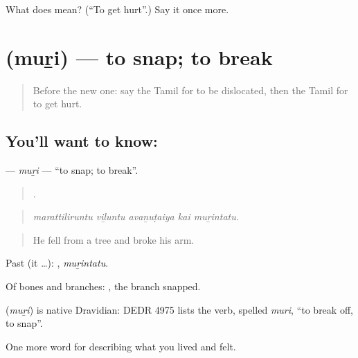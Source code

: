 \begin{tcolorbox}[breakable,colback=teal!4,colframe=teal!35!black,title={Before you move on}]
What does  mean? (\textquotedblleft{}To get hurt\textquotedblright{}.) Say it once more.
\end{tcolorbox}
\section[\texorpdfstring{\ta{முறி} (muṟi)}{முறி (muṟi)}]{ (muṟi) — to snap; to break}

\label{lesson:TA-C482-muri}



\begin{quote}
Before the new one: say the Tamil for to be dislocated, then the Tamil for to get hurt.
\end{quote}

\subsection*{You'll want to know: }
\textbf{} — \emph{muṟi} — \textquotedblleft{}to snap; to break\textquotedblright{}.

\begin{quote}
    .
\end{quote}

\begin{quote}
\emph{marattiliruntu viḻuntu avaṉuṭaiya kai muṟintatu.}
\end{quote}

\begin{quote}
He fell from a tree and broke his arm.
\end{quote}

Past (it …): , \emph{muṟintatu}.

Of bones and branches:  , the branch snapped.

\begin{cousinweb}
\textbf{} (\emph{muṟi}) is native Dravidian: DEDR 4975 lists the verb, spelled \emph{muri}, \textquotedblleft{}to break off, to snap\textquotedblright{}.
\end{cousinweb}

\begin{grammarlens}[title={What you've built}]
One more word for describing what you lived and felt.
\end{grammarlens}

